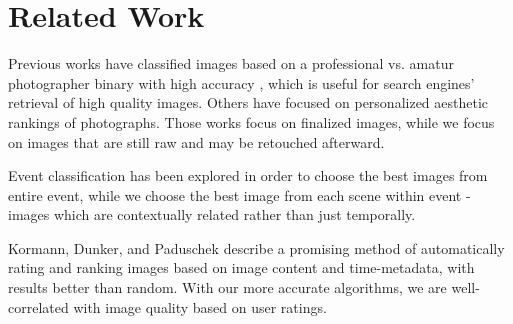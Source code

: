 \documentclass{article}
\begin{document}
\section{Related Work}

Previous works have classified images based on a professional vs. amatur photographer binary with high accuracy\cite{1640788} \cite{springerlink:10.1007/11744078_23}\cite{springerlink:10.1007/978-3-540-88690-7_29}, which is useful for search engines' retrieval of high quality images. Others have focused on personalized aesthetic rankings of photographs\cite {Sun:2009:PAB:1631272.1631351}\cite {Yeh:2010:PPR:1873951.1873963}. Those works focus on finalized images, while we focus on images that are still raw and may be retouched afterward.

Event classification has been explored in order to choose the best images from entire event\cite{1223566}\cite{4444209}, while we choose the best image from each scene within event - images which are contextually related rather than just temporally.

Kormann, Dunker, and Paduschek\cite{springerlink:10.1007/978-3-642-10543-2_23} describe a promising method of automatically rating and ranking images based on image content and time-metadata, with results better than random. With our more accurate algorithms, we are well-correlated with image quality based on user ratings.




\end{document}
